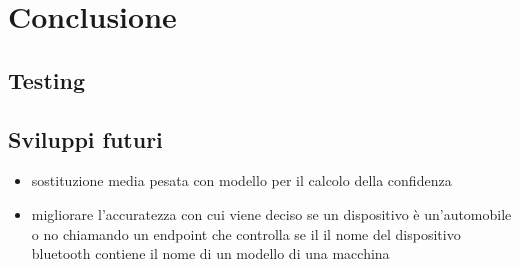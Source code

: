 \chapter{Conclusione}
\section{Testing}
\section{Sviluppi futuri}
\begin{itemize}
    \item sostituzione media pesata con modello per il calcolo della confidenza
    \item migliorare l'accuratezza con cui viene deciso se un dispositivo è un'automobile o no chiamando un endpoint che controlla se il il nome del dispositivo bluetooth contiene il nome di un modello di una macchina
\end{itemize}